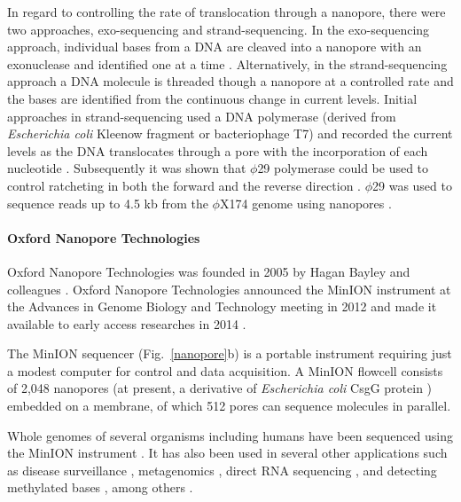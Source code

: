 In regard to controlling the rate of translocation through a nanopore,
there were two approaches, exo-sequencing and strand-sequencing.
In the exo-sequencing approach, individual bases from a DNA are cleaved
into a nanopore with an exonuclease and identified one at a time
\citep{astier2006toward,clarke2009continuous}.
Alternatively, in the strand-sequencing approach a DNA molecule is
threaded though a nanopore at a controlled rate and the bases are
identified from the continuous change in current levels. Initial
approaches in strand-sequencing used a DNA polymerase (derived from
\emph{Escherichia coli} Kleenow fragment or bacteriophage T7) and
recorded the current levels as the DNA translocates through a pore with
the incorporation of each nucleotide
\citep{benner2007sequence,cockroft2008single,gyarfas2009mapping,
chu2010real}.
%
Subsequently it was shown that $\phi$29 polymerase could be used to control
ratcheting in both the forward and the reverse direction
\citep{lieberman2010processive,manrao2012reading,cherf2012automated}.
$\phi$29 was used to sequence reads up to 4.5 kb from the $\phi$X174 genome
using nanopores \citep{laszlo2014decoding}.


\paragraph{Oxford Nanopore Technologies}
Oxford Nanopore Technologies was founded in 2005 by Hagan Bayley and
colleagues \citep{deamer2016three}. Oxford Nanopore Technologies
announced the MinION instrument at the Advances in Genome Biology and
Technology meeting in 2012 and made it available to early access
researches in 2014 \citep{deamer2016three,bayley2015nanopore}.

The MinION sequencer (Fig.~\ref{nanopore}b) is a portable instrument
requiring just a modest computer for control and data acquisition.  A
MinION flowcell consists of 2,048 nanopores (at present, a derivative of
\emph{Escherichia coli} CsgG protein \citep{brown2016nanopore}) embedded
on a membrane, of which 512 pores can sequence molecules in parallel.

Whole genomes of several organisms including humans have been sequenced
using the MinION instrument \citep{loman2015complete,stancu2017mapping,
jain2018nanopore,bowden2019sequencing,moss2020complete}. It has also
been used in several other applications such as disease surveillance
\citep{quick2016real,faria2016mobile}, metagenomics
\citep{goordial2017situ,charalampous2019nanopore,leggett2020rapid},
direct RNA sequencing \citep{garalde2018highly,workman2019nanopore,
depledge2019direct}, and detecting methylated bases
\citep{rand2017mapping,simpson2017detecting,liu2019accurate}, among
others \citep{jain2016oxford}.

